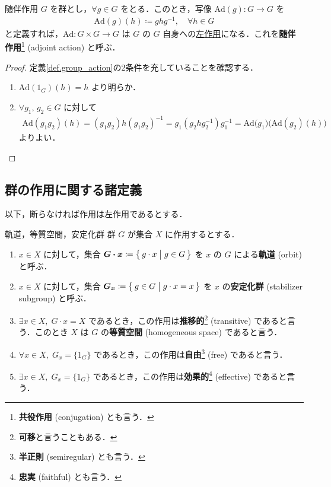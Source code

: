 \documentclass[geometry_main]{subfiles}
\begin{document}
\begin{mydef}[label=def.adjoint_action]{随伴作用}
	$G$ を群とし，$\forall g \in G$ をとる．このとき，写像 $\mathrm{Ad}(g) \colon G \to G$ を 
	\begin{align}
		\mathrm{Ad}(g)(h) \coloneqq ghg^{-1},\quad \forall h \in G
	\end{align}
	と定義すれば，$\mathrm{Ad} \colon G\times G \to G$ は $G$ の $G$ 自身への\underline{左作用}になる．これを\textbf{随伴作用}\footnote{\textbf{共役作用} (conjugation) とも言う．} (adjoint action) と呼ぶ．
\end{mydef}

\begin{proof}
	定義\ref{def.group_action}の2条件を充していることを確認する．
	\begin{enumerate}
		\item $\mathrm{Ad}(1_G)(h) = h$ より明らか．
		\item $\forall g_1,\, g_2 \in G$ に対して
		\begin{align}
			\mathrm{Ad}(g_1g_2)(h) = (g_1g_2)h(g_1g_2)^{-1} = g_1(g_2hg_2^{-1})g_1^{-1} = \mathrm{Ad}\bigl(g_1\bigr)\bigl( \mathrm{Ad}(g_2)(h) \bigr) 
		\end{align}
		よりよい．
	\end{enumerate}
\end{proof}


\subsection{群の作用に関する諸定義}

以下，断らなければ作用は左作用であるとする．
\begin{mydef}[label=def.orbit]{軌道，等質空間，安定化群}
	群 $G$ が集合 $X$ に作用するとする．
	\begin{enumerate}
		\item $x \in X$ に対して，集合 $\bm{G \cdot x} \coloneqq \bigl\{\, g\cdot x \bigm| g \in G \,\bigr\} $ を $x$ の $G$ による\textbf{軌道} (orbit) と呼ぶ．
		\item $x \in X$ に対して，集合 $\bm{G_x} \coloneqq \bigl\{\, g \in G \bigm| g \cdot x = x \,\bigr\} $ を $x$ の\textbf{安定化群} (stabilizer subgroup) と呼ぶ．
		\item $\exists x \in X,\; G\cdot x = X$ であるとき，この作用は\textbf{推移的}\footnote{\textbf{可移}と言うこともある．} (transitive) であると言う．このとき $X$ は $G$ の\textbf{等質空間} (homogeneous space) であると言う． 
		\item $\forall x \in X,\; G_x = \{1_G\}$ であるとき，この作用は\textbf{自由}\footnote{\textbf{半正則} (semiregular) とも言う．} (free) であると言う．
		\item $\exists x \in X,\; G_x = \{1_G\}$ であるとき，この作用は\textbf{効果的}\footnote{\textbf{忠実} (faithful) とも言う．} (effective) であると言う．
	\end{enumerate}
\end{mydef}
\end{document}
